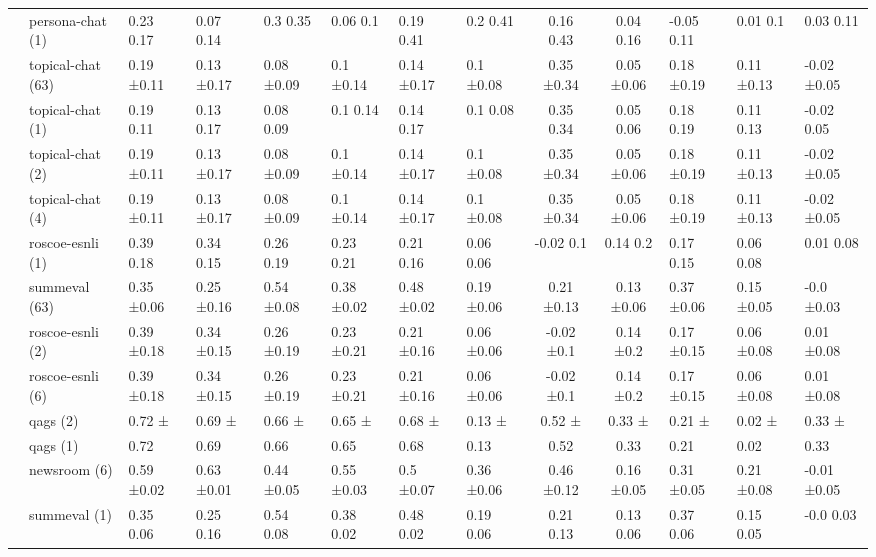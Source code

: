 \begin{tabular}{llllllll|cc}
 & persona-chat (1) & 0.23 0.17 & 0.07 0.14 & 0.3 0.35 & 0.06 0.1 & 0.19 0.41 & 0.2 0.41 & 0.16 0.43 & 0.04 0.16 & -0.05 0.11 & 0.01 0.1 & 0.03 0.11 \\
 & topical-chat (63) & 0.19 ±0.11 & 0.13 ±0.17 & 0.08 ±0.09 & 0.1 ±0.14 & 0.14 ±0.17 & 0.1 ±0.08 & 0.35 ±0.34 & 0.05 ±0.06 & 0.18 ±0.19 & 0.11 ±0.13 & -0.02 ±0.05 \\
 & topical-chat (1) & 0.19 0.11 & 0.13 0.17 & 0.08 0.09 & 0.1 0.14 & 0.14 0.17 & 0.1 0.08 & 0.35 0.34 & 0.05 0.06 & 0.18 0.19 & 0.11 0.13 & -0.02 0.05 \\
 & topical-chat (2) & 0.19 ±0.11 & 0.13 ±0.17 & 0.08 ±0.09 & 0.1 ±0.14 & 0.14 ±0.17 & 0.1 ±0.08 & 0.35 ±0.34 & 0.05 ±0.06 & 0.18 ±0.19 & 0.11 ±0.13 & -0.02 ±0.05 \\
 & topical-chat (4) & 0.19 ±0.11 & 0.13 ±0.17 & 0.08 ±0.09 & 0.1 ±0.14 & 0.14 ±0.17 & 0.1 ±0.08 & 0.35 ±0.34 & 0.05 ±0.06 & 0.18 ±0.19 & 0.11 ±0.13 & -0.02 ±0.05 \\
 & roscoe-esnli (1) & 0.39 0.18 & 0.34 0.15 & 0.26 0.19 & 0.23 0.21 & 0.21 0.16 & 0.06 0.06 & -0.02 0.1 & 0.14 0.2 & 0.17 0.15 & 0.06 0.08 & 0.01 0.08 \\
 & summeval (63) & 0.35 ±0.06 & 0.25 ±0.16 & 0.54 ±0.08 & 0.38 ±0.02 & 0.48 ±0.02 & 0.19 ±0.06 & 0.21 ±0.13 & 0.13 ±0.06 & 0.37 ±0.06 & 0.15 ±0.05 & -0.0 ±0.03 \\
 & roscoe-esnli (2) & 0.39 ±0.18 & 0.34 ±0.15 & 0.26 ±0.19 & 0.23 ±0.21 & 0.21 ±0.16 & 0.06 ±0.06 & -0.02 ±0.1 & 0.14 ±0.2 & 0.17 ±0.15 & 0.06 ±0.08 & 0.01 ±0.08 \\
 & roscoe-esnli (6) & 0.39 ±0.18 & 0.34 ±0.15 & 0.26 ±0.19 & 0.23 ±0.21 & 0.21 ±0.16 & 0.06 ±0.06 & -0.02 ±0.1 & 0.14 ±0.2 & 0.17 ±0.15 & 0.06 ±0.08 & 0.01 ±0.08 \\
 & qags (2) & 0.72 ± & 0.69 ± & 0.66 ± & 0.65 ± & 0.68 ± & 0.13 ± & 0.52 ± & 0.33 ± & 0.21 ± & 0.02 ± & 0.33 ± \\
 & qags (1) & 0.72  & 0.69  & 0.66  & 0.65  & 0.68  & 0.13  & 0.52  & 0.33  & 0.21  & 0.02  & 0.33  \\
 & newsroom (6) & 0.59 ±0.02 & 0.63 ±0.01 & 0.44 ±0.05 & 0.55 ±0.03 & 0.5 ±0.07 & 0.36 ±0.06 & 0.46 ±0.12 & 0.16 ±0.05 & 0.31 ±0.05 & 0.21 ±0.08 & -0.01 ±0.05 \\
 & summeval (1) & 0.35 0.06 & 0.25 0.16 & 0.54 0.08 & 0.38 0.02 & 0.48 0.02 & 0.19 0.06 & 0.21 0.13 & 0.13 0.06 & 0.37 0.06 & 0.15 0.05 & -0.0 0.03 \\

\end{tabular}
